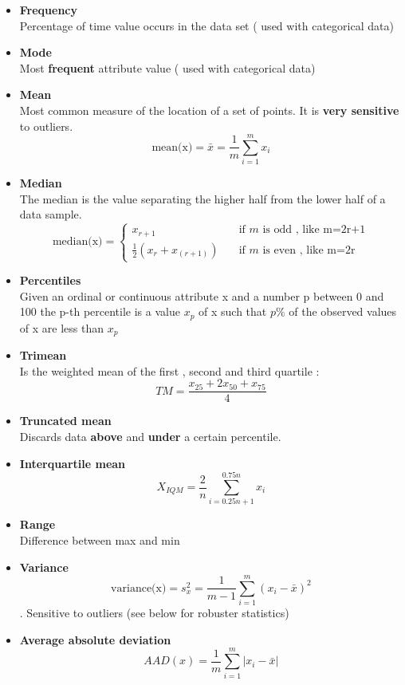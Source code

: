 \begin{itemize}
\item \textbf{Frequency}\\
Percentage of time value occurs in the data set ( used with categorical data)
\item \textbf{Mode}\\
Most \textbf{frequent} attribute value ( used with categorical data)
\item \textbf{Mean}\\
Most common measure of the location of a set of points. It is \textbf{very sensitive} to outliers.$$ \text{mean(x)} = \bar{x} = \frac{1}{m} \sum \limits_{i=1}^{m}x_i $$
\item \textbf{Median}\\
The median is the value separating the higher half from the lower half of a data sample. \[ \text{median(x)}= 
  \begin{cases}
    x_{r+1} & \quad \text{if } m \text{ is odd , like m=2r+1}\\
    \frac{1}{2}(x_r + x_{(r+1)})  & \quad \text{if } m \text{ is even , like m=2r}
  \end{cases}
\]
\item \textbf{Percentiles}\\
Given an ordinal or continuous attribute x and a number p between 0 and 100  the p-th percentile is a value $x_p$ of x such that $p\%$ of the observed values of x are less than $x_p$
\item \textbf{Trimean}\\
Is the weighted mean of the first , second and third quartile : $$TM= \frac{x_{25}+2x_{50}+x_{75}} {4}$$
\item \textbf{Truncated mean}\\
Discards data \textbf{above} and \textbf{under} a certain percentile.
\item \textbf{Interquartile mean}\\
$$X_{IQM} = \frac{2}{n} \sum \limits_{i=0.25n+1}^{0.75n} x_i$$
\item \textbf{Range}\\
Difference between max and min
\item \textbf{Variance}\\
$$ \text{variance(x)}= s^{2}_x  = \frac{1}{m-1} \sum \limits_{i=1}^{m}(x_i - \bar{x})^2$$. Sensitive to outliers (see below for robuster statistics) 
\item \textbf{Average absolute deviation}\\
$$ AAD(x)  = \frac{1}{m} \sum \limits_{i=1}^{m} |x_i - \bar{x}|$$

\end{itemize}
